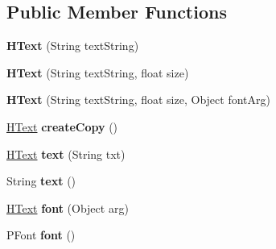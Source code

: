 \subsection*{Public Member Functions}
\begin{DoxyCompactItemize}
\item 
\hypertarget{classhype_1_1drawable_1_1_h_text_ac9b84354f82c63669dd676eb988b6425}{{\bfseries H\-Text} (String text\-String)}\label{classhype_1_1drawable_1_1_h_text_ac9b84354f82c63669dd676eb988b6425}

\item 
\hypertarget{classhype_1_1drawable_1_1_h_text_a670828657fd6d3443dc99d404b6436a3}{{\bfseries H\-Text} (String text\-String, float size)}\label{classhype_1_1drawable_1_1_h_text_a670828657fd6d3443dc99d404b6436a3}

\item 
\hypertarget{classhype_1_1drawable_1_1_h_text_af39e7ea27726741693fd6c957ccd02cf}{{\bfseries H\-Text} (String text\-String, float size, Object font\-Arg)}\label{classhype_1_1drawable_1_1_h_text_af39e7ea27726741693fd6c957ccd02cf}

\item 
\hypertarget{classhype_1_1drawable_1_1_h_text_ae908bda8c33aa5a70e82e4ae1b8f3187}{\hyperlink{classhype_1_1drawable_1_1_h_text}{H\-Text} {\bfseries create\-Copy} ()}\label{classhype_1_1drawable_1_1_h_text_ae908bda8c33aa5a70e82e4ae1b8f3187}

\item 
\hypertarget{classhype_1_1drawable_1_1_h_text_a647993e931bb74cdf36ff2eb7d3ed30f}{\hyperlink{classhype_1_1drawable_1_1_h_text}{H\-Text} {\bfseries text} (String txt)}\label{classhype_1_1drawable_1_1_h_text_a647993e931bb74cdf36ff2eb7d3ed30f}

\item 
\hypertarget{classhype_1_1drawable_1_1_h_text_ae5d3e5e1a7d0cc2578327408936dd740}{String {\bfseries text} ()}\label{classhype_1_1drawable_1_1_h_text_ae5d3e5e1a7d0cc2578327408936dd740}

\item 
\hypertarget{classhype_1_1drawable_1_1_h_text_a539acc29624f344e82c7a43e342ec927}{\hyperlink{classhype_1_1drawable_1_1_h_text}{H\-Text} {\bfseries font} (Object arg)}\label{classhype_1_1drawable_1_1_h_text_a539acc29624f344e82c7a43e342ec927}

\item 
\hypertarget{classhype_1_1drawable_1_1_h_text_a273e812e78225a53012e00595543591d}{P\-Font {\bfseries font} ()}\label{classhype_1_1drawable_1_1_h_text_a273e812e78225a53012e00595543591d}


\end{DoxyCompactItemize}
